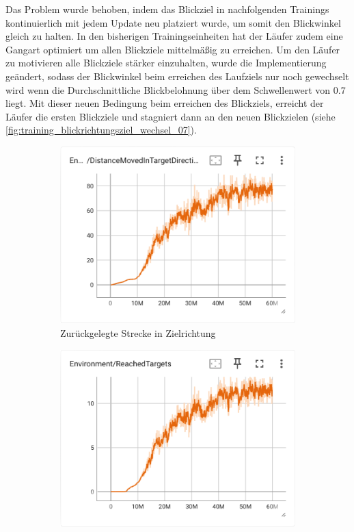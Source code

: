 Das Problem wurde behoben, indem das Blickziel in nachfolgenden Trainings kontinuierlich mit jedem Update neu platziert wurde, um somit den Blickwinkel gleich zu halten. In den bisherigen Trainingseinheiten hat der Läufer zudem eine Gangart optimiert um allen Blickziele mittelmäßig zu erreichen. Um den Läufer zu motivieren alle Blickziele stärker einzuhalten, wurde die Implementierung geändert, sodass der Blickwinkel beim erreichen des Laufziels nur noch gewechselt wird wenn die Durchschnittliche Blickbelohnung über dem Schwellenwert von 0.7 liegt. Mit dieser neuen Bedingung beim erreichen des Blickziels, erreicht der Läufer die ersten Blickziele und stagniert dann an den neuen Blickzielen (siehe \ref{fig:training_blickrichtungsziel_wechsel_07}).

\begin{figure}[H]
  \centering  
    \begin{subfigure}{.49\textwidth}
      \centering  
      \includegraphics[width=\textwidth]{img/113_move_target_dir}
      \caption{Zurückgelegte Strecke in Zielrichtung}
      \label{fig:113_move_target_dir}
    \end{subfigure}
    \begin{subfigure}{.49\textwidth}
      \centering  
      \includegraphics[width=\textwidth]{img/113_reach_target}

\end{subfigure}
\end{figure}
